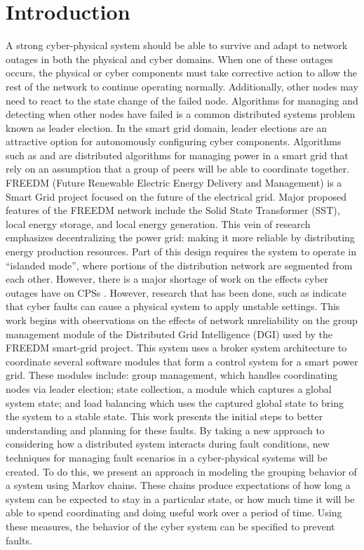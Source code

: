 \chapter{Introduction}
A strong cyber-physical system should be able to survive and adapt to network outages in both the physical and cyber domains. When one of these outages occurs, the physical or cyber components must take corrective action to allow the rest of the network to continue operating normally. Additionally, other nodes may need to react to the state change of the failed node. Algorithms for managing and detecting when other nodes have failed is a common distributed systems problem known as leader election.
In the smart grid domain, leader elections are an attractive option for autonomously configuring cyber components. Algorithms such as \cite{LOADBALANCING} and \cite{INCREMENTALCONSENSUS} are distributed algorithms for managing power in a smart grid that rely on an assumption that a group of peers will be able to coordinate together. 
FREEDM (Future Renewable Electric Energy Delivery and Management) is a Smart Grid project focused on the future of the electrical grid. Major proposed features of the FREEDM network include the Solid State Transformer (SST), local energy storage, and local energy generation\cite{FREEDMMIGRATION}. This vein of research emphasizes decentralizing the power grid: making it more reliable by distributing energy production resources. Part of this design requires the system to operate in “islanded mode”, where portions of the distribution network are segmented from each other. However, there is a major shortage of work on the effects cyber outages have on CPSs \cite{CYBERRESEARCHCALL} \cite{SMARTGRIDBENEFITS}. However, research that has been done, such as \cite{HARINI} indicate that cyber faults can cause a physical system to apply unstable settings.
This work begins with observations on the effects of network unreliability on the group management module of the Distributed Grid Intelligence (DGI) used by the FREEDM smart-grid project. This system uses a broker system architecture to coordinate several software modules that form a control system for a smart power grid. These modules include: group management, which handles coordinating nodes via leader election; state collection, a module which captures a global system state; and load balancing which uses the captured global state to bring the system to a stable state.
This work presents the initial steps to better understanding and planning for these faults. By taking a new approach to considering how a distributed system interacts during fault conditions, new techniques for managing fault scenarios in a cyber-physical systems will be created. To do this, we present an approach in modeling the grouping behavior of a system using Markov chains. These chains produce expectations of how long a system can be expected to stay in a particular state, or how much time it will be able to spend coordinating and doing useful work over a period of time. Using these measures, the behavior of the cyber system can be specified to prevent faults.

